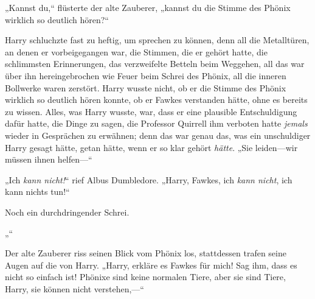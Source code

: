„Kannst du,“ flüsterte der alte Zauberer, „kannst du die Stimme des Phönix wirklich so deutlich hören?“

Harry schluchzte fast zu heftig, um sprechen zu können, denn all die Metalltüren, an denen er vorbeigegangen war, die Stimmen, die er gehört hatte, die schlimmsten Erinnerungen, das verzweifelte Betteln beim Weggehen, all das war über ihn hereingebrochen wie Feuer beim Schrei des Phönix, all die inneren Bollwerke waren zerstört. Harry wusste nicht, ob er die Stimme des Phönix wirklich so deutlich hören konnte, ob er Fawkes verstanden hätte, ohne es bereits zu wissen. Alles, was Harry wusste, war, dass er eine plausible Entschuldigung dafür hatte, die Dinge zu sagen, die Professor Quirrell ihm verboten hatte \emph{jemals} wieder in Gesprächen zu erwähnen; denn das war genau das, was ein unschuldiger Harry gesagt hätte, getan hätte, wenn er so klar gehört \emph{hätte}. „Sie leiden—wir müssen ihnen helfen—“

„Ich \emph{kann nicht!}“ rief Albus Dumbledore. „Harry, Fawkes, ich \emph{kann nicht}, ich kann nichts tun!“

Noch ein durchdringender Schrei.

„“

Der alte Zauberer riss seinen Blick vom Phönix los, stattdessen trafen seine Augen auf die von Harry. „Harry, erkläre es Fawkes für mich! Sag ihm, dass es nicht so einfach ist! Phönixe sind keine normalen Tiere, aber sie sind Tiere, Harry, sie können nicht verstehen,—“

